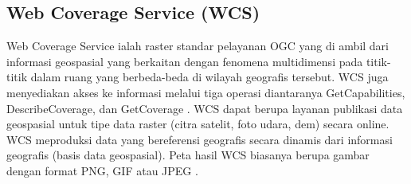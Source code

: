 \subsection{Web Coverage Service (WCS)}
Web Coverage Service ialah raster standar pelayanan OGC yang di ambil dari informasi geospasial yang berkaitan dengan fenomena multidimensi pada titik-titik dalam ruang yang berbeda-beda di wilayah geografis tersebut. WCS juga menyediakan akses ke informasi melalui tiga operasi diantaranya GetCapabilities, DescribeCoverage, dan GetCoverage \cite{soeharwintoperancangan}.
WCS dapat berupa layanan publikasi data geospasial untuk tipe data raster (citra satelit, foto udara, dem) secara online. WCS meproduksi data yang bereferensi geografis secara dinamis dari informasi geografis (basis data geospasial). Peta hasil WCS biasanya berupa gambar dengan format PNG, GIF atau JPEG \cite{supriyo2014perancangan}.


